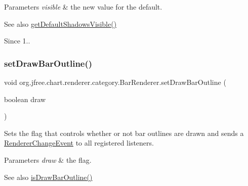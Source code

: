 \begin{DoxyParams}{Parameters}
{\em visible} & the new value for the default.\\
\hline
\end{DoxyParams}
\begin{DoxySeeAlso}{See also}
\mbox{\hyperlink{classorg_1_1jfree_1_1chart_1_1renderer_1_1category_1_1_bar_renderer_a0aabafc66981c21dd8fa5b98193d5a9d}{get\+Default\+Shadows\+Visible()}}
\end{DoxySeeAlso}
\begin{DoxySince}{Since}
1.. 
\end{DoxySince}
\mbox{\label{classorg_1_1jfree_1_1chart_1_1renderer_1_1category_1_1_bar_renderer_ae1e06caa24551602f7d3953ca986d34f}} 
\subsubsection{\texorpdfstring{set\+Draw\+Bar\+Outline()}{setDrawBarOutline()}}
{\footnotesize\ttfamily void org.\+jfree.\+chart.\+renderer.\+category.\+Bar\+Renderer.\+set\+Draw\+Bar\+Outline (\begin{DoxyParamCaption}\item[{boolean}]{draw }\end{DoxyParamCaption})}

Sets the flag that controls whether or not bar outlines are drawn and sends a \mbox{\hyperlink{}{Renderer\+Change\+Event}} to all registered listeners.


\begin{DoxyParams}{Parameters}
{\em draw} & the flag.\\
\hline
\end{DoxyParams}
\begin{DoxySeeAlso}{See also}
\mbox{\hyperlink{classorg_1_1jfree_1_1chart_1_1renderer_1_1category_1_1_bar_renderer_a93b7d40219432ad6890575cbebbd3296}{is\+Draw\+Bar\+Outline()}} 
\end{DoxySeeAlso}
\mbox{\label{classorg_1_1jfree_1_1chart_1_1renderer_1_1category_1_1_bar_renderer_a002489c071cec14df64cb013f3548444}} 
